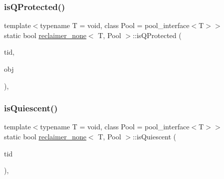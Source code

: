 \mbox{\label{classreclaimer__none_a73618ce8985667a837c5cbed9914def2}} 
\subsubsection{\texorpdfstring{is\+Q\+Protected()}{isQProtected()}}
{\footnotesize\ttfamily template$<$typename T  = void, class Pool  = pool\+\_\+interface$<$\+T$>$$>$ \\
static bool \hyperlink{classreclaimer__none}{reclaimer\+\_\+none}$<$ T, Pool $>$\+::is\+Q\+Protected (\begin{DoxyParamCaption}\item[{const int}]{tid,  }\item[{T $\ast$const}]{obj }\end{DoxyParamCaption})\hspace{0.3cm}{\ttfamily [inline]}, {\ttfamily [static]}}

\mbox{\label{classreclaimer__none_aa02fae6b14e76f5c2bf940b118eb54e3}} 
\subsubsection{\texorpdfstring{is\+Quiescent()}{isQuiescent()}}
{\footnotesize\ttfamily template$<$typename T  = void, class Pool  = pool\+\_\+interface$<$\+T$>$$>$ \\
static bool \hyperlink{classreclaimer__none}{reclaimer\+\_\+none}$<$ T, Pool $>$\+::is\+Quiescent (\begin{DoxyParamCaption}\item[{const int}]{tid }\end{DoxyParamCaption})\hspace{0.3cm}{\ttfamily [inline]}, {\ttfamily [static]}}

\mbox{\label{classreclaimer__none_a8bc86fce7f71f6238dfd50ce06803d66}} 
